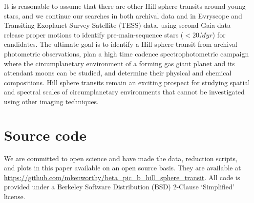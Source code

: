 \documentclass[longauth]{aa} %
\begin{document}
It is reasonable to assume that there are other Hill sphere transits around young stars, and we continue our searches in both archival data and in Evryscope and Transiting Exoplanet Survey Satellite (TESS) data, using second Gaia data release proper motions to identify pre-main-sequence stars ($<20Myr$) for candidates.
%
The ultimate goal is to identify a Hill sphere transit from archival photometric observations, plan a high time cadence spectrophotometric campaign where the circumplanetary environment of a forming gas giant planet and its attendant moons can be studied, and determine their physical and chemical compositions.
%
Hill sphere transits remain an exciting prospect for studying spatial and spectral scales of circumplanetary environments that cannot be investigated using other imaging techniques.

\section{Source code}
We are committed to open science and have made the data, reduction scripts, and plots in this paper available on an open source basis.
%
They are available at \url{https://github.com/mkenworthy/beta_pic_b_hill_sphere_transit}.
%
All code is provided under a Berkeley Software Distribution (BSD) 2-Clause `Simplified' license.

\end{document}
